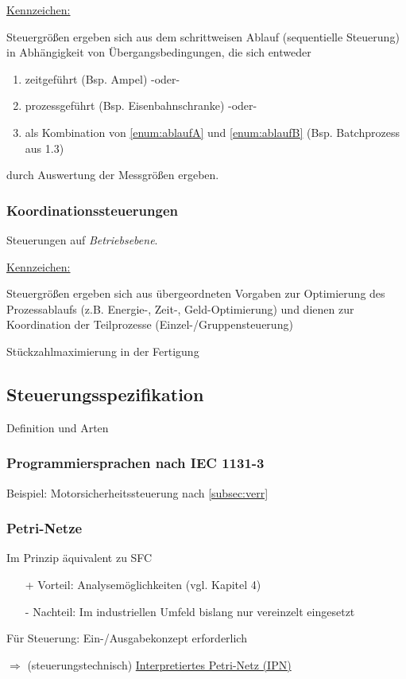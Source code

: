 \underline{Kennzeichen:}

Steuergrößen ergeben sich aus dem schrittweisen Ablauf (sequentielle Steuerung) in Abhängigkeit von Übergangsbedingungen, die sich entweder
\begin{enumerate}[label=(\alph*)]
	\item zeitgeführt (Bsp. Ampel) -oder- \label{enum:ablaufA}
	\item prozessgeführt (Bsp. Eisenbahnschranke) -oder- \label{enum:ablaufB}
	\item als Kombination von \ref{enum:ablaufA} und \ref{enum:ablaufB} (Bsp. Batchprozess aus 1.3)
\end{enumerate}
durch Auswertung der Messgrößen ergeben.

\subsubsection{Koordinationssteuerungen}
Steuerungen auf \textit{Betriebsebene}.

\underline{Kennzeichen:}

Steuergrößen ergeben sich aus übergeordneten Vorgaben zur Optimierung des Prozessablaufs (z.B. Energie-, Zeit-, Geld-Optimierung) und dienen zur Koordination der Teilprozesse (Einzel-/Gruppensteuerung)

Stückzahlmaximierung in der Fertigung

\subsection{Steuerungsspezifikation}
Definition und Arten 

\subsubsection{Programmiersprachen nach IEC 1131-3}
Beispiel: Motorsicherheitssteuerung nach \ref{subsec:verr} 

\subsubsection{Petri-Netze}
Im Prinzip äquivalent zu SFC
\begin{itemize}
	\item[+] Vorteil: Analysemöglichkeiten (vgl. Kapitel 4)
	\item[-] Nachteil: Im industriellen Umfeld bislang nur vereinzelt eingesetzt 
\end{itemize} 

Für Steuerung: Ein-/Ausgabekonzept erforderlich

$\Rightarrow$ (steuerungstechnisch) \underline{Interpretiertes Petri-Netz (IPN)}









